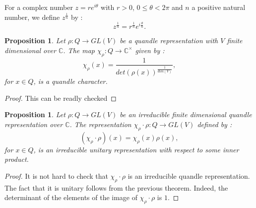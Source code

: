 \documentclass[12pt, reqno]{amsart}
\newtheorem{proposition}[theorem]{Proposition}
\begin{document}
For a complex number $z=re^{i\theta}$ with $r>0$, $ 0\leq \theta < 2\pi$ and $n$ a positive natural number, we define $z^{\frac{1}{n}}$ by :
$$z^{\frac{1}{n}}=r^{\frac{1}{n}}e^{i\frac{\theta}{n}}.$$
\begin{proposition}
Let $\rho : Q \to GL(V)$ be a quandle representation with $V$ finite dimensional over $\mathbb{C}$. The map $\chi_\rho : Q \to \mathbb{C}^\times$ given by :
$$\chi_\rho(x)=\frac{1}{det(\rho(x))^{\frac{1}{dim(V)}}},$$
for $x\in Q$, is a quandle character.
\end{proposition}
\begin{proof}
This can be readly checked
\end{proof}
\begin{proposition}
Let $\rho :Q \to GL(V)$ be an irreducible finite dimensional quandle representation over $\mathbb{C}$. The representation $\chi_\rho \cdot \rho : Q  \to GL(V)$ defined by :
$$(\chi_\rho \cdot \rho)(x)=\chi_\rho(x)  \rho(x),$$
for $x \in Q$, is an irreducible unitary representation with respect to some inner product.
\end{proposition}
\begin{proof}
It is not hard to check that $\chi_\rho\cdot \rho $ is an irreducible quandle representation. The fact that it is unitary follows from the previous theorem. Indeed, the determinant of the elements of the image of $\chi_\rho \cdot \rho$ is $1$.
\end{proof}
\end{document}
